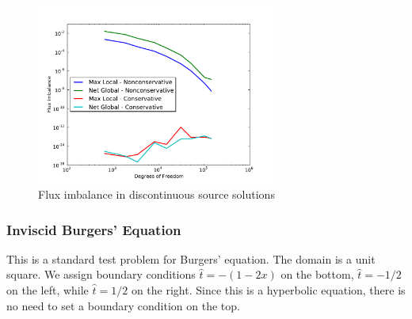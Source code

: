 \documentclass[Proposal.tex]{subfiles}
\begin{document}
\begin{figure}[p]
\centering
\includegraphics[width=0.7\textwidth]{figs/Discontinuous/modifiedFlux.pdf}
\caption{Flux imbalance in discontinuous source solutions}
\label{fig:discontinuous_flux}
\end{figure}

\subsubsection{Inviscid Burgers' Equation}\label{sec:inviscidBurgers}
This is a standard test problem for Burgers' equation. The domain is a unit
square. We assign boundary conditions $\hat t=-(1-2x)$ on the bottom, $\hat
t=-1/2$ on the left, while $\hat t=1/2$ on the right. Since this is a
hyperbolic equation, there is no need to set a boundary condition on the top.
\end{document}
